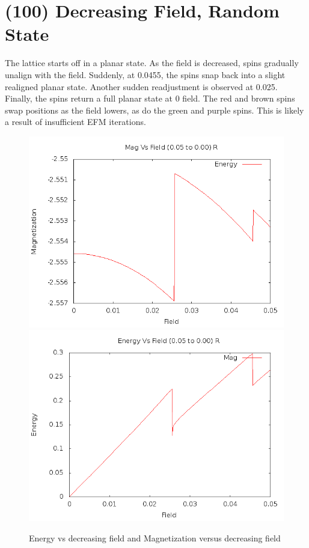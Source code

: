 \documentclass{article}
\begin{document}
\section{(100) Decreasing Field, Random State}
The lattice starts off in a planar state. As the field is decreased, spins gradually unalign with the field. 
Suddenly, at 0.0455, the spins snap back into a slight realigned planar state. Another sudden readjustment
is observed at 0.025. Finally, the spins return a full planar state at 0 field. The red and brown spins
swap positions as the field lowers, as do the green and purple spins. This is likely a result of insufficient EFM iterations.
\begin{figure}[h]
 \centering 
\includegraphics[scale=0.3]{100/E005to000R.png}
\includegraphics[scale=0.3]{100/M005to000R.png}
\caption{Energy vs decreasing field and Magnetization versus decreasing field}
\end{figure}
\end{document}
